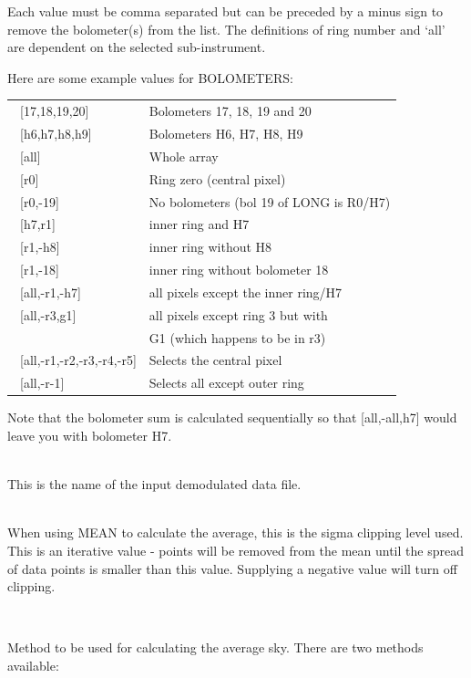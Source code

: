 \documentclass[twoside,11pt]{article}
\renewcommand{\_}{\texttt{\symbol{95}}}
\newcommand{\sstsubsection}[1]{ \item[{#1}] \mbox{} \\}
\newcommand{\sstitemlist}[1]{
  \mbox{} \\
  \vspace{-3.5ex}
  \begin{itemize}
     #1
  \end{itemize}
}
\newcommand{\sstsubsection}[1]{\item[{#1}]}
\newcommand{\sstitemlist}[1]{
      \begin{itemize}
         #1
      \end{itemize}
      \\
   }
\begin{document}
{{{   Each value must be comma separated but can be preceded by a minus sign to
remove the bolometer(s) from the list. The definitions of ring number and
`all' are dependent on the selected sub-instrument.

  Here are some example values for BOLOMETERS:

 \begin{tabular}{ll}

 \ [17,18,19,20]  &                  Bolometers 17, 18, 19 and 20\\
 \ [h6,h7,h8,h9]  &                  Bolometers H6, H7, H8, H9 \\
 \ [all]          &                  Whole array \\
 \ [r0]           &                  Ring zero (central pixel)\\
 \ [r0,-19]       &                  No bolometers (bol 19 of LONG is R0/H7)\\
 \ [h7,r1]        &                  inner ring and H7\\
 \ [r1,-h8]       &                  inner ring without H8\\
 \ [r1,-18]       &                  inner ring without bolometer 18\\
 \ [all,-r1,-h7]  &                  all pixels except the inner ring/H7\\
 \ [all,-r3,g1]   &                  all pixels except ring 3 but with\\
   &                                      G1 (which happens to be in r3)\\
 \ [all,-r1,-r2,-r3,-r4,-r5]  &      Selects the central pixel \\            
 \ [all,-r-1]     &                  Selects all except outer ring\\

 \end{tabular}

Note that the bolometer sum is calculated sequentially so that [all,-all,h7]
would leave you with bolometer H7.

      }
      \sstsubsection{
         IN = NDF (Read)
      }{
         This is the name of the input demodulated data file.
      }
      \sstsubsection{
         ITER\_SIGMA = REAL (Read)
      }{
         When using MEAN to calculate the average, this is the sigma clipping
         level used. This is an iterative value - points will be removed
         from the mean until the spread of data points is smaller than
         this value. Supplying a negative value  will turn off clipping.
      }
      \sstsubsection{
         MODE = CHAR (Read)
      }{
         Method to be used for calculating the average sky. There are
         two methods available:
         \sstitemlist{

}}}}
\end{document}
